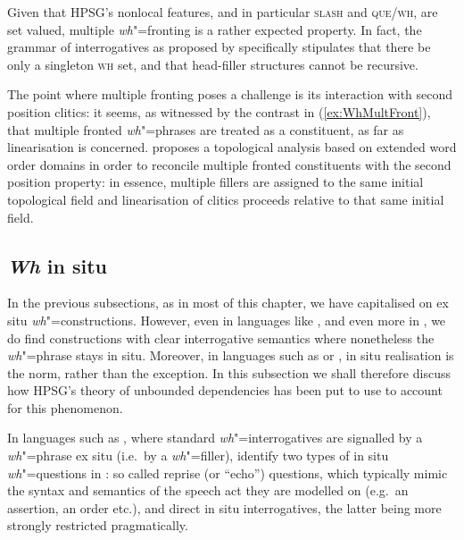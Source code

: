 \documentclass[output=paper
,notxmath 
	        ,collection
	        ,collectionchapter
 	        ,biblatex
                ,babelshorthands
                ,newtxmath
                ,draftmode
                ,colorlinks, citecolor=brown
]{langscibook}
\begin{document}
\noindent
Given that HPSG's nonlocal features, and in particular \textsc{slash}
and \textsc{que}/\textsc{wh}, are set valued, multiple \emph{wh}"=fronting is a
rather expected property. In fact, the grammar of 
interrogatives as proposed by \citet{Ginzburg:Sag:01} specifically
stipulates that there be only a singleton \textsc{wh} set, and that
head-filler structures cannot be recursive.

The point where  multiple fronting poses a challenge is its
interaction with second position clitics: it seems, as witnessed by
the contrast in (\ref{ex:WhMultFront}), that multiple fronted
\emph{wh}"=phrases are treated as a constituent, as far as
linearisation is concerned. \citet{Penn:99} proposes a topological
analysis based on extended word order domains
\citep{Reape:90,kathol_a00} in order to reconcile multiple fronted
constituents with the second position property: in essence, multiple
fillers are assigned to the same initial topological field and
linearisation of clitics proceeds relative to that same initial field.


\subsection{\emph{Wh} in situ}
\label{sec:UDC:WhInSitu}

In the previous subsections, as in most of this chapter, we have
capitalised on ex situ \emph{wh}"=constructions. However, even in
languages like , and even more in , we do find
constructions with clear interrogative semantics where nonetheless the
\emph{wh}"=phrase stays in situ. Moreover, in languages such as
 or  , in situ realisation is the norm, rather
than the exception. In this subsection we shall therefore discuss how
HPSG's theory of unbounded dependencies has been put to use to account
for this phenomenon.

In languages such as , where standard \emph{wh}"=interrogatives
are signalled by a \emph{wh}"=phrase ex situ (i.e.\ by a
\emph{wh}"=filler), \citet{Ginzburg:Sag:01}\addpages identify two types of in
situ \emph{wh}"=questions in : so called reprise (or ``echo'')
questions, which typically mimic the syntax and semantics of the
speech act they are modelled on (e.g.\ an assertion, an order etc.),
and direct in situ interrogatives, the latter being more strongly
restricted
pragmatically. %
\end{document}
